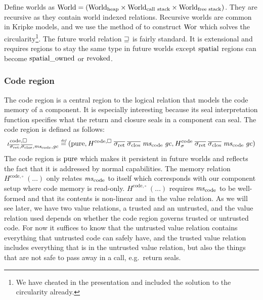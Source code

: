\documentclass[acmsmall,review,anonymous]{acmart}\settopmatter{printfolios=true,printccs=false,printacmref=false}
\renewcommand{\Worlds}{\World_{\mathrm{call\ stack}}}
\begin{document}
Define worlds as $\World = (\Worldh \times \Worlds \times \Worldfs)$. They are recursive as they contain world indexed relations. Recursive worlds are common in Kripke models, and we use the method of \citet{Birkedal:2011:SKM:1926385.1926401,Birkedal_taste_2014} to construct $\mathrm{Wor}$ which solves the circularity\footnote{We have cheated in the presentation and included the solution to the circularity already.}.
The future world relation $\sqsupseteq$ is fairly standard.
It is extensional and requires regions to stay the same type in future worlds except $\mathrm{spatial}$ regions can become $\mathrm{spatial\_owned}$ or $\mathrm{revoked}$.

\subsubsection{Code region}
The code region is a central region to the logical relation that models the code memory of a component.
It is especially interesting because its seal interpretation function specifies what the return and closure seals in a component can seal.
The code region is defined as follows:
\[
  \codereg{\sigrets,\sigcloss,\mscode,\gc} \defeq (\pure,
  H^\mathrm{code,\square} \; \sigrets \; \sigcloss \; \mscode \; \gc,
  H^\mathrm{code}_\sigma \; \sigrets \; \sigcloss \; \mscode \; \gc)
\]
The code region is $\mathrm{pure}$ which makes it persistent in future worlds and reflects the fact that it is addressed by normal capabilities.
The memory relation $H^\mathrm{code,\square} \; (\dots)$ only relates $\mscode$ to itself which corresponds with our component setup where code memory is read-only.
$H^\mathrm{code,\square} \; (\dots)$ requires $\mscode$ to be well-formed and that its contents is non-linear and in the value relation.
As we will see later, we have two value relations, a trusted and an untrusted, and the value relation used depends on whether the code region governs trusted or untrusted code.
For now it suffices to know that the untrusted value relation contains everything that untrusted code can safely have, and the trusted value relation includes everything that is in the untrusted value relation, but also the things that are not safe to pass away in a call, e.g.\ return seals.
\end{document}
